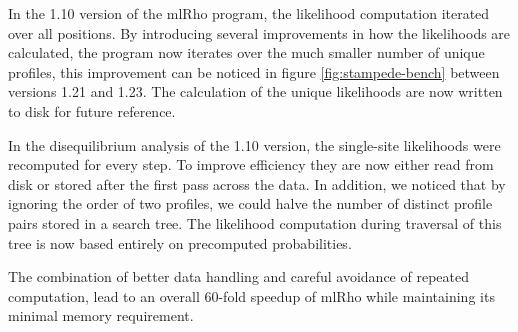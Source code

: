 \documentclass{sig-alternate}
\newcommand{\ty}{\texttt}
\begin{document}
In the 1.10 version of the mlRho program, the likelihood computation iterated over all positions. By
introducing several improvements in how the likelihoods are calculated, the program now iterates over the much
smaller number of unique profiles, this improvement can be noticed in figure \ref{fig:stampede-bench} between
versions 1.21 and 1.23.
The calculation of the unique likelihoods are now written to disk for future reference.

In the disequilibrium analysis of the 1.10 version, the single-site likelihoods were recomputed for every
step. To improve efficiency they are now either read from disk or stored after the first pass across the
data. In addition, we noticed that by ignoring the order of two profiles, we could halve the number of
distinct profile pairs stored in a search tree. The likelihood computation during traversal of this tree is
now based entirely on precomputed probabilities.


The combination of better data handling and careful avoidance of repeated computation, lead to an overall 60-fold
speedup of mlRho while maintaining its minimal memory requirement.
\end{document}
